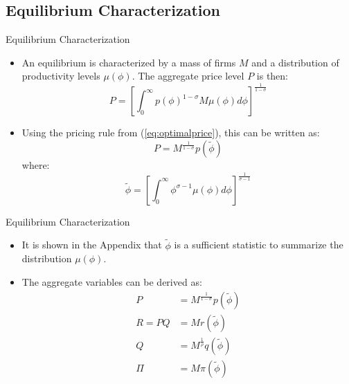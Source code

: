 \documentclass[aspectratio=169]{beamer}
\begin{document}

\subsection{Equilibrium Characterization}


\begin{frame}{Equilibrium Characterization}

\begin{itemize}
    \item<1-> An equilibrium is characterized by a mass of firms $ M $ and a distribution of productivity levels $ \mu\left( \phi \right) $.  The aggregate price level $ P $ is then:
    \begin{equation*}
        P = \left[ \int_{0}^{\infty} p\left( \phi \right)^{1 - \sigma} M \mu\left( \phi \right) d\phi \right]^{\frac{1}{1 - \sigma}}
    \end{equation*}
    \item<2-> Using the pricing rule from (\ref{eq:optimalprice}), this can be written as:
    \begin{equation*}
        P = M^{\frac{1}{1 - \sigma}} p\left( \tilde{\phi} \right)
    \end{equation*}
    where:
    \begin{equation*}
        \tilde{\phi} = \left[ \int_{0}^{\infty} \phi^{\sigma - 1} \mu\left( \phi \right) d\phi \right]^{\frac{1}{\sigma - 1}}
    \end{equation*}
\end{itemize}
    
\end{frame}


\begin{frame}{Equilibrium Characterization}

\begin{itemize}
    \item<1-> It is shown in the Appendix that $ \tilde{\phi} $ is a sufficient statistic to summarize the distribution $ \mu\left( \phi \right)$.
    \item<2-> The aggregate variables can be derived as:
    \begin{equation*}
        \begin{split}
           P &= M^{\frac{1}{1 - \sigma}} p\left( \tilde{\phi} \right) \\
           R = PQ &= M r\left( \tilde{\phi} \right) \\
           Q &= M^{\frac{1}{\rho}} q\left( \tilde{\phi} \right) \\
           \Pi &= M \pi \left( \tilde{\phi} \right)
        \end{split}
    \end{equation*}
\end{itemize}
    
\end{frame}
\end{document}
